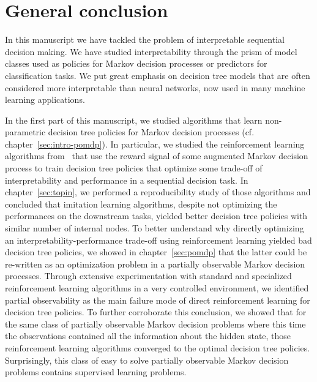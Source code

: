 \chapter*{General conclusion}
In this manuscript we have tackled the problem of interpretable sequential decision making.
We have studied interpretability through the prism of model classes used as policies for Markov decision processes or predictors for classification tasks.
We put great emphasis on decision tree models that are often considered more interpretable than neural networks, now used in many machine learning applications.

In the first part of this manuscript, we studied algorithms that learn non-parametric decision tree policies for Markov decision processes (cf. chapter~\ref{sec:intro-pomdp}).
In particular, we studied the reinforcement learning algorithms from~\cite{topin2021iterative} that use the reward signal of some augmented Markov decision process to train decision tree policies that optimize some trade-off of interpretability and performance in a sequential decision task.
In chapter~\ref{sec:topin}, we performed a reproducibility study of those algorithms and concluded that imitation learning algorithms, despite not optimizing the performances on the downstream tasks, yielded better decision tree policies with similar number of internal nodes.
To better understand why directly optimizing an interpretability-performance trade-off using reinforcement learning yielded bad decision tree policies, we showed in chapter~\ref{sec:pomdp} that the latter could be re-written as an optimization problem in a partially observable Markov decision processes.
Through extensive experimentation with standard and specialized reinforcement learning algorithms in a very controlled environment, we identified partial observability as the main failure mode of direct reinforcement learning for decision tree policies.
To further corroborate this conclusion, we showed that for the same class of partially observable Markov decision problems where this time the observations contained all the information about the hidden state, those reinforcement learning algorithms converged to the optimal decision tree policies.
Surprisingly, this class of easy to solve partially observable Markov decision problems contains supervised learning problems.

